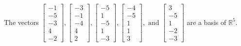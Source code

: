 \begin{exercise}
\begin{exerciseStatement}
  \end{exerciseStatement}
  \begin{exerciseAnswer}
   The vectors \(\left[\begin{array}{r}
-1 \\
-5 \\
-3 \\
4 \\
-2
\end{array}\right] , \left[\begin{array}{r}
-3 \\
-1 \\
-4 \\
4 \\
2
\end{array}\right] , \left[\begin{array}{r}
-5 \\
1 \\
-5 \\
1 \\
-3
\end{array}\right] , \left[\begin{array}{r}
-4 \\
-5 \\
1 \\
1 \\
3
\end{array}\right] , \text{ and } \left[\begin{array}{r}
3 \\
-5 \\
1 \\
-2 \\
-3
\end{array}\right]\) 
  	 are  a basis of \(\mathbb{R}^5\).
  


  \end{exerciseAnswer}
\end{exercise}